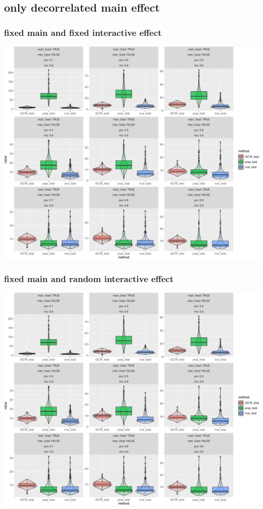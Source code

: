 \documentclass[]{article}
\begin{document}
\subsection{only decorrelated main
effect}\label{only-decorrelated-main-effect}

\subsubsection{fixed main and fixed interactive
effect}\label{fixed-main-and-fixed-interactive-effect-1}

\includegraphics{Simulation_report_chi_resamle_files/figure-latex/fixed fixed decorr main-1.pdf}

\subsubsection{fixed main and random interactive
effect}\label{fixed-main-and-random-interactive-effect-1}

\includegraphics{Simulation_report_chi_resamle_files/figure-latex/fixed random decorr main-1.pdf}
\end{document}
